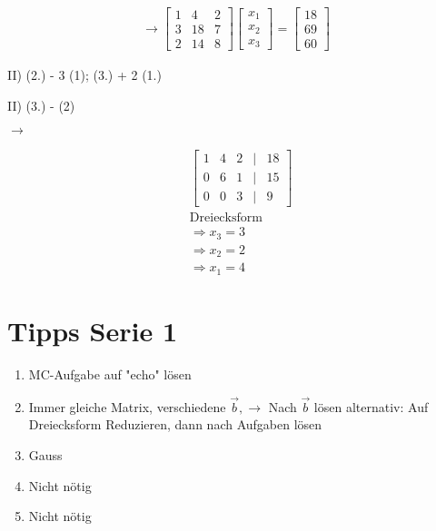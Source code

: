 \documentclass{article}
\begin{document}
    
    \begin{align*}
        \rightarrow 
        \begin{bmatrix}
            1 & 4 & 2 \\
            3 & 18 & 7 \\
            2 & 14 & 8
        \end{bmatrix}
        \begin{bmatrix}
            x_1 \\ x_2 \\ x_3
        \end{bmatrix}
        = 
        \begin{bmatrix}
            18 \\ 69 \\ 60
        \end{bmatrix}
    \end{align*}

    II) (2.) - 3 (1); (3.) + 2 (1.)

    II) (3.) - (2) 

    $\rightarrow$

    \begin{align*}
        &\begin{bmatrix}
           1 & 4 & 2 &|& 18 \\
            0 & 6 & 1 &|& 15 \\
            0 & 0 & 3 &|& 9
        \end{bmatrix} \\&\text{Dreiecksform}\\
        &\Rightarrow x_3 = 3 \\
        &\Rightarrow x_2 = 2 \\
        &\Rightarrow x_1 = 4
    \end{align*}

    \newpage
    \section{Tipps Serie 1}

    \begin{enumerate}[(1)]
        \item MC-Aufgabe auf "echo" lösen
        \item Immer gleiche Matrix, verschiedene $\vec{b}, \rightarrow$ Nach $\vec{b}$ lösen
        \subitem alternativ: Auf Dreiecksform Reduzieren, dann nach Aufgaben lösen
        \item Gauss 
        \item Nicht nötig
        \item Nicht nötig
    \end{enumerate}
    
\end{document}
